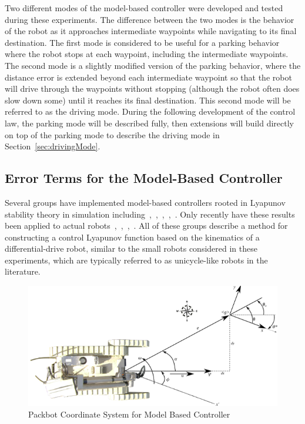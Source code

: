 Two different modes of the model-based controller were developed and tested during these experiments. The difference between the two modes is the behavior of the robot as it approaches intermediate waypoints while navigating to its final destination. The first mode is considered to be useful for a parking behavior where the robot stops at each waypoint, including the intermediate waypoints. The second mode is a slightly modified version of the parking behavior, where the distance error is extended beyond each intermediate waypoint so that the robot will drive through the waypoints without stopping (although the robot often does slow down some) until it reaches its final destination. This second mode will be referred to as the driving mode. During the following development of the control law, the parking mode will be described fully, then extensions will build directly on top of the parking mode to describe the driving mode in Section~\ref{sec:drivingMode}.

\subsection{Error Terms for the Model-Based Controller}%
\label{sec:errorTermsMBC}
Several groups have implemented model-based controllers rooted in Lyapunov stability theory in simulation including~\cite{MicaelliLyapunov93},~\cite{Aicardi94},~\cite{Aicardi_UnicycleLyapunov95},~\cite{Rusu05RobotuxLyapunov},~\cite{Gulati08}. Only recently have these results been applied to actual robots~\cite{KimLyapunov05},~\cite{Lapierre06},~\cite{Lapierre07},~\cite{NuchterLyapunov07}. All of these groups describe a method for constructing a control Lyapunov function based on the kinematics of a differential-drive robot, similar to the small robots considered in these experiments, which are typically referred to as unicycle-like robots in the literature.

\begin{figure}[ht!]
\centering
\includegraphics[width=.95\textwidth]{images/packbotlyapunov}
\caption{Packbot Coordinate System for Model Based Controller}%
\label{fig:pblyapunov}
\end{figure}

